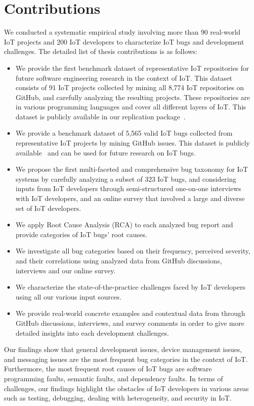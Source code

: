 \section{Contributions  }
We conducted a systematic empirical study involving more than 90 real-world IoT projects and 200 IoT developers to characterize IoT bugs and development challenges. The detailed list of thesis contributions is as follows:
\begin{itemize}
\item {We provide the first benchmark dataset of representative IoT repositories for future software engineering research in the context of IoT. This dataset consists of 91 IoT projects collected by mining all 8,774 IoT repositories on GitHub, and carefully analyzing the resulting projects. These repositories are in various programming languages and cover all different layers of IoT. This dataset is publicly available in our replication package~\cite{repPack}}.
\item {We provide a benchmark dataset of 5,565 valid IoT bugs collected from representative IoT projects by mining GitHub issues. This dataset is publicly available~\cite{repPack} and can be used for future research on IoT bugs.}
\item {We propose the first multi-faceted and comprehensive bug taxonomy for IoT systems by carefully analyzing a subset of 323 IoT bugs, and considering inputs from IoT developers through semi-structured one-on-one interviews with IoT developers, and an online survey that involved a large and diverse set of IoT developers.}
\item {We apply Root Cause Analysis (RCA) to each analyzed bug report and provide categories of IoT bugs' root causes.}
\item{We investigate all bug categories based on their frequency, perceived severity, and their correlations using analyzed data from GitHub discussions, interviews and our online survey.}
\item {We characterize the state-of-the-practice challenges faced by IoT developers using all our various input sources.} 
\item{We provide real-world concrete examples and contextual data from through GitHub discussions, interviews, and survey comments in order to give more detailed insights into each development challenges.}
\end{itemize}

Our findings show that general development issues, device management issues, and messaging issues are the most frequent bug categories in the context of IoT. Furthermore, the most frequent root causes of IoT bugs are software programming faults, semantic faults, and dependency faults. In terms of challenges, our findings highlight the obstacles of IoT developers in various areas such as testing, debugging, dealing with heterogeneity, and security in IoT. 

